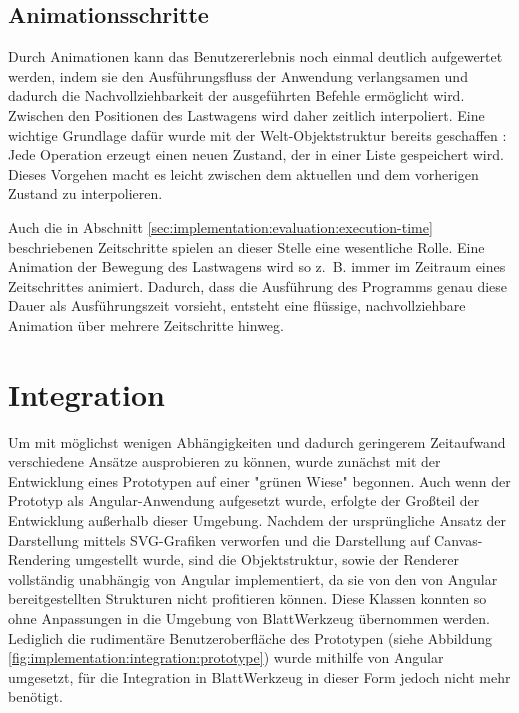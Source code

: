 \subsection{Animationsschritte}
\label{sec:implementation:rendering:animation}

Durch Animationen kann das Benutzererlebnis noch einmal deutlich aufgewertet werden, indem sie den Ausführungsfluss der Anwendung verlangsamen und dadurch die Nachvollziehbarkeit der ausgeführten Befehle ermöglicht wird. Zwischen den Positionen des Lastwagens wird daher zeitlich interpoliert. Eine wichtige Grundlage dafür wurde mit der Welt-Objektstruktur bereits geschaffen : Jede Operation erzeugt einen neuen Zustand, der in einer Liste gespeichert wird. Dieses Vorgehen macht es leicht zwischen dem aktuellen und dem vorherigen Zustand zu interpolieren.

Auch die in Abschnitt \ref{sec:implementation:evaluation:execution-time} beschriebenen Zeitschritte spielen an dieser Stelle eine wesentliche Rolle. Eine Animation der Bewegung des Lastwagens wird so z.~B. immer im Zeitraum eines Zeitschrittes animiert. Dadurch, dass die Ausführung des Programms genau diese Dauer als Ausführungszeit vorsieht, entsteht eine flüssige, nachvollziehbare Animation über mehrere Zeitschritte hinweg.

\section[Integration]{Integration\protect\footnotemark}
\label{sec:implementation:integration}


Um mit möglichst wenigen Abhängigkeiten und dadurch geringerem Zeitaufwand verschiedene Ansätze ausprobieren zu können, wurde zunächst mit der Entwicklung eines Prototypen auf einer "grünen Wiese" begonnen. Auch wenn der Prototyp als Angular-Anwendung aufgesetzt wurde, erfolgte der Großteil der Entwicklung außerhalb dieser Umgebung. Nachdem der ursprüngliche Ansatz der Darstellung mittels SVG-Grafiken verworfen und die Darstellung auf Canvas-Rendering umgestellt wurde, sind die Objektstruktur, sowie der Renderer vollständig unabhängig von Angular implementiert, da sie von den von Angular bereitgestellten Strukturen nicht profitieren können. Diese Klassen konnten so ohne Anpassungen in die Umgebung von BlattWerkzeug übernommen werden. Lediglich die rudimentäre Benutzeroberfläche des Prototypen (siehe Abbildung \ref{fig:implementation:integration:prototype}) wurde mithilfe von Angular umgesetzt, für die Integration in BlattWerkzeug in dieser Form jedoch nicht mehr benötigt.

